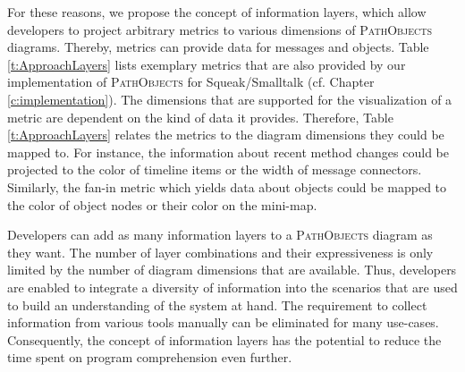 For these reasons, we propose the concept of information layers, which allow developers to project arbitrary metrics to various dimensions of \textsc{PathObjects} diagrams.
Thereby, metrics can provide data for messages and objects.
Table \ref{t:ApproachLayers} lists exemplary metrics that are also provided by our  implementation of \textsc{PathObjects} for Squeak/Smalltalk (cf. Chapter \ref{c:implementation}).
The dimensions that are supported for the visualization of a metric are dependent on the kind of data it provides.
Therefore, Table \ref{t:ApproachLayers} relates the metrics to the diagram dimensions they could be mapped to.
For instance, the information about recent method changes could be projected to the color of timeline items or the width of message connectors.
Similarly, the fan-in metric which yields data about objects could be mapped to the color of object nodes or their color on the mini-map.

Developers can add as many information layers to a \textsc{PathObjects} diagram as they want.
The number of layer combinations and their expressiveness is only limited by the number of diagram dimensions that are available.
Thus, developers are enabled to integrate a diversity of information into the scenarios that are used to build an understanding of the system at hand.
The requirement to collect information from various tools manually can be eliminated for many use-cases.
Consequently, the concept of information layers has the potential to reduce the time spent on program comprehension even further.

